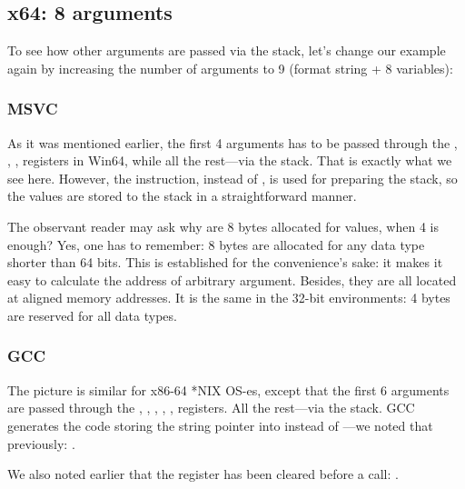 \subsection{x64: 8 arguments}

\label{example_printf8_x64}
To see how other arguments are passed via the stack, let's change our example again 
by increasing the number of arguments to 9 (\printf format string + 8 \Tint variables):



\subsubsection{MSVC}

As it was mentioned earlier, the first 4 arguments has to be passed through the \RCX, \RDX, ,  registers in Win64, while all the rest---via the stack.
That is exactly what we see here.
However, the \MOV instruction, instead of \PUSH, is used for preparing the stack, so the values are stored to the stack in a straightforward manner.



The observant reader may ask why are 8 bytes allocated for \Tint values, when 4 is enough?
Yes, one has to remember: 8 bytes are allocated for any data type shorter than 64 bits.
This is established for the convenience's sake: it makes it easy to calculate the address of arbitrary argument.
Besides, they are all located at aligned memory addresses.
It is the same in the 32-bit environments: 4 bytes are reserved for all data types.


\ifdefined\IncludeGCC
\subsubsection{GCC}

The picture is similar for x86-64 *NIX OS-es, except that the first 6 arguments are passed through the \RDI, \RSI,
\RDX, \RCX, ,  registers.
All the rest---via the stack.
GCC generates the code storing the string pointer into \EDI instead of \RDI{}---we noted that previously: 
.

We also noted earlier that the \EAX register has been cleared before a \printf call: .

